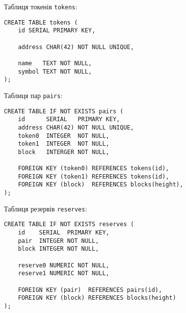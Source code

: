 \documentclass[14pt]{extarticle}
\begin{document}
Таблиця токенів \texttt{tokens}:

\begin{verbatim}
CREATE TABLE tokens (
    id SERIAL PRIMARY KEY,

    address CHAR(42) NOT NULL UNIQUE,

    name   TEXT NOT NULL,
    symbol TEXT NOT NULL,
);
\end{verbatim}

Таблиця пар \texttt{pairs}:

\begin{verbatim}
CREATE TABLE IF NOT EXISTS pairs (
    id      SERIAL   PRIMARY KEY,
    address CHAR(42) NOT NULL UNIQUE,
    token0  INTEGER  NOT NULL,
    token1  INTEGER  NOT NULL,
    block   INTERGER NOT NULL,

    FOREIGN KEY (token0) REFERENCES tokens(id),
    FOREIGN KEY (token1) REFERENCES tokens(id),
    FOREIGN KEY (block)  REFERENCES blocks(height),
);
\end{verbatim}

Таблиця резервів \texttt{reserves}:

\begin{verbatim}
CREATE TABLE IF NOT EXISTS reserves (
    id    SERIAL  PRIMARY KEY,
    pair  INTEGER NOT NULL,
    block INTEGER NOT NULL,

    reserve0 NUMERIC NOT NULL,
    reserve1 NUMERIC NOT NULL,

    FOREIGN KEY (pair)  REFERENCES pairs(id),
    FOREIGN KEY (block) REFERENCES blocks(height)
);
\end{verbatim}
\end{document}

